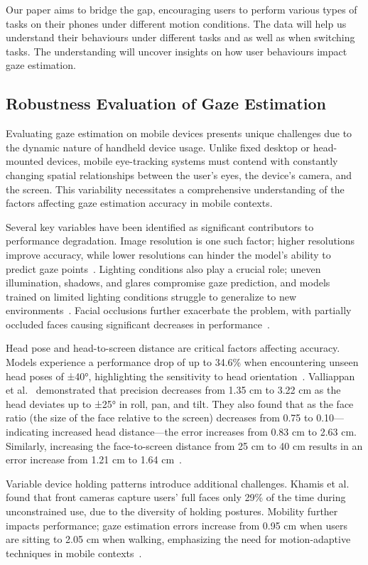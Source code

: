Our paper aims to bridge the gap, encouraging users to perform various types of tasks on their phones under different motion conditions. The data will help us understand their behaviours under different tasks and as well as when switching tasks. The understanding will uncover insights on how user behaviours impact gaze estimation. 


\subsection{Robustness Evaluation of Gaze Estimation}
Evaluating gaze estimation on mobile devices presents unique challenges due to the dynamic nature of handheld device usage. Unlike fixed desktop or head-mounted devices, mobile eye-tracking systems must contend with constantly changing spatial relationships between the user's eyes, the device's camera, and the screen. This variability necessitates a comprehensive understanding of the factors affecting gaze estimation accuracy in mobile contexts.

Several key variables have been identified as significant contributors to performance degradation. Image resolution is one such factor; higher resolutions improve accuracy, while lower resolutions can hinder the model's ability to predict gaze points~\cite{zhang19mpiigaze}. Lighting conditions also play a crucial role; uneven illumination, shadows, and glares compromise gaze prediction, and models trained on limited lighting conditions struggle to generalize to new environments~\cite{zhang19mpiigaze, zhang2020eth}. Facial occlusions further exacerbate the problem, with partially occluded faces causing significant decreases in performance~\cite{zhang2017fullface}.

Head pose and head-to-screen distance are critical factors affecting accuracy. Models experience a performance drop of up to 34.6\% when encountering unseen head poses of ±40°, highlighting the sensitivity to head orientation~\cite{zhang2020eth}. Valliappan et al.~\cite{valliappan2020accelerating} demonstrated that precision decreases from 1.35 cm to 3.22 cm as the head deviates up to ±25° in roll, pan, and tilt. They also found that as the face ratio (the size of the face relative to the screen) decreases from 0.75 to 0.10—indicating increased head distance—the error increases from 0.83 cm to 2.63 cm. Similarly, increasing the face-to-screen distance from 25 cm to 40 cm results in an error increase from 1.21 cm to 1.64 cm~\cite{huang2017screenglint}.

Variable device holding patterns introduce additional challenges. Khamis et al.~\cite{khamis2018understanding} found that front cameras capture users' full faces only 29\% of the time during unconstrained use, due to the diversity of holding postures. Mobility further impacts performance; gaze estimation errors increase from 0.95 cm when users are sitting to 2.05 cm when walking, emphasizing the need for motion-adaptive techniques in mobile contexts~\cite{lei2023DynamicRead}.

